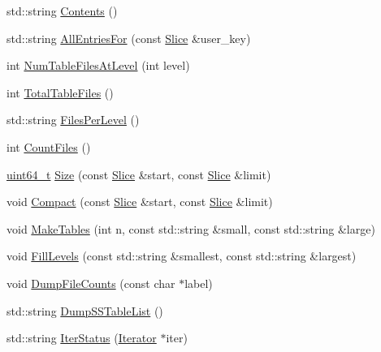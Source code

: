 \begin{DoxyCompactItemize}
\item 
std\+::string \hyperlink{classleveldb_1_1_d_b_test_a3cf871664bd22c6ed2d6c2a8834b49fc}{Contents} ()
\item 
std\+::string \hyperlink{classleveldb_1_1_d_b_test_adaf171601eaaf2cd24edaa394752f733}{All\+Entries\+For} (const \hyperlink{classleveldb_1_1_slice}{Slice} \&user\+\_\+key)
\item 
int \hyperlink{classleveldb_1_1_d_b_test_aa7c845810f6d57b0655eda370e8de33f}{Num\+Table\+Files\+At\+Level} (int level)
\item 
int \hyperlink{classleveldb_1_1_d_b_test_a05fa745351a41ecc0165b391a605b79e}{Total\+Table\+Files} ()
\item 
std\+::string \hyperlink{classleveldb_1_1_d_b_test_a0e4d6292bcbe450d34b558d48a51a331}{Files\+Per\+Level} ()
\item 
int \hyperlink{classleveldb_1_1_d_b_test_a0c6c0c1d470a50fdcb6cdbc54977e907}{Count\+Files} ()
\item 
\hyperlink{stdint_8h_aaa5d1cd013383c889537491c3cfd9aad}{uint64\+\_\+t} \hyperlink{classleveldb_1_1_d_b_test_a2b16106ccbd302127b5c0575e74e6be1}{Size} (const \hyperlink{classleveldb_1_1_slice}{Slice} \&start, const \hyperlink{classleveldb_1_1_slice}{Slice} \&limit)
\item 
void \hyperlink{classleveldb_1_1_d_b_test_a9b6cd10fd7c8fc54127b0c40c0ac7db5}{Compact} (const \hyperlink{classleveldb_1_1_slice}{Slice} \&start, const \hyperlink{classleveldb_1_1_slice}{Slice} \&limit)
\item 
void \hyperlink{classleveldb_1_1_d_b_test_ace931478fa5ad2c48a8aa95a344e19fd}{Make\+Tables} (int n, const std\+::string \&small, const std\+::string \&large)
\item 
void \hyperlink{classleveldb_1_1_d_b_test_ac291d06db907f5fee7caf04f44f65493}{Fill\+Levels} (const std\+::string \&smallest, const std\+::string \&largest)
\item 
void \hyperlink{classleveldb_1_1_d_b_test_ad045c5203b4ea785ab335ffc3ea833b3}{Dump\+File\+Counts} (const char $\ast$label)
\item 
std\+::string \hyperlink{classleveldb_1_1_d_b_test_afdfc077be555dea7eac220623f6d4deb}{Dump\+S\+S\+Table\+List} ()
\item 
std\+::string \hyperlink{classleveldb_1_1_d_b_test_ad162fa0f5a31e61ee94ba9f45af716f8}{Iter\+Status} (\hyperlink{classleveldb_1_1_iterator}{Iterator} $\ast$iter)
\end{DoxyCompactItemize}
